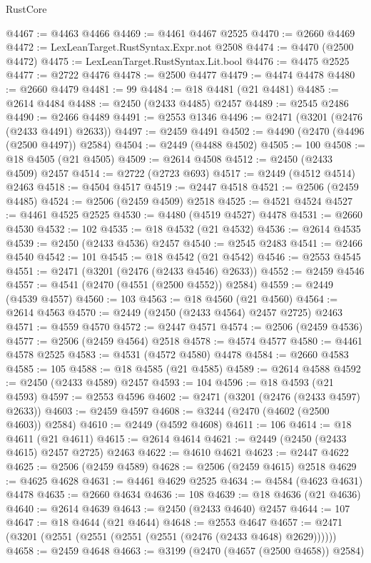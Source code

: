 \begin{lexlean}{RustCore}
\begin{coremodule}
@4467 := @4463 @4466
@4469 := @4461 @4467 @2525
@4470 := @2660 @4469
@4472 := LexLeanTarget.RustSyntax.Expr.not @2508
@4474 := @4470 (@2500 @4472)
@4475 := LexLeanTarget.RustSyntax.Lit.bool
@4476 := @4475 @2525
@4477 := @2722 @4476
@4478 := @2500 @4477
@4479 := @4474 @4478
@4480 := @2660 @4479
@4481 := 99
@4484 := @18 @4481 (@21 @4481)
@4485 := @2614 @4484
@4488 := @2450 (@2433 @4485) @2457
@4489 := @2545 @2486
@4490 := @2466 @4489
@4491 := @2553 @1346
@4496 := @2471 (@3201 (@2476 (@2433 @4491) @2633))
@4497 := @2459 @4491
@4502 := @4490 (@2470 (@4496 (@2500 @4497)) @2584)
@4504 := @2449 (@4488 @4502)
@4505 := 100
@4508 := @18 @4505 (@21 @4505)
@4509 := @2614 @4508
@4512 := @2450 (@2433 @4509) @2457
@4514 := @2722 (@2723 @693)
@4517 := @2449 (@4512 @4514) @2463
@4518 := @4504 @4517
@4519 := @2447 @4518
@4521 := @2506 (@2459 @4485)
@4524 := @2506 (@2459 @4509) @2518
@4525 := @4521 @4524
@4527 := @4461 @4525 @2525
@4530 := @4480 (@4519 @4527) @4478
@4531 := @2660 @4530
@4532 := 102
@4535 := @18 @4532 (@21 @4532)
@4536 := @2614 @4535
@4539 := @2450 (@2433 @4536) @2457
@4540 := @2545 @2483
@4541 := @2466 @4540
@4542 := 101
@4545 := @18 @4542 (@21 @4542)
@4546 := @2553 @4545
@4551 := @2471 (@3201 (@2476 (@2433 @4546) @2633))
@4552 := @2459 @4546
@4557 := @4541 (@2470 (@4551 (@2500 @4552)) @2584)
@4559 := @2449 (@4539 @4557)
@4560 := 103
@4563 := @18 @4560 (@21 @4560)
@4564 := @2614 @4563
@4570 := @2449 (@2450 (@2433 @4564) @2457 @2725) @2463
@4571 := @4559 @4570
@4572 := @2447 @4571
@4574 := @2506 (@2459 @4536)
@4577 := @2506 (@2459 @4564) @2518
@4578 := @4574 @4577
@4580 := @4461 @4578 @2525
@4583 := @4531 (@4572 @4580) @4478
@4584 := @2660 @4583
@4585 := 105
@4588 := @18 @4585 (@21 @4585)
@4589 := @2614 @4588
@4592 := @2450 (@2433 @4589) @2457
@4593 := 104
@4596 := @18 @4593 (@21 @4593)
@4597 := @2553 @4596
@4602 := @2471 (@3201 (@2476 (@2433 @4597) @2633))
@4603 := @2459 @4597
@4608 := @3244 (@2470 (@4602 (@2500 @4603)) @2584)
@4610 := @2449 (@4592 @4608)
@4611 := 106
@4614 := @18 @4611 (@21 @4611)
@4615 := @2614 @4614
@4621 := @2449 (@2450 (@2433 @4615) @2457 @2725) @2463
@4622 := @4610 @4621
@4623 := @2447 @4622
@4625 := @2506 (@2459 @4589)
@4628 := @2506 (@2459 @4615) @2518
@4629 := @4625 @4628
@4631 := @4461 @4629 @2525
@4634 := @4584 (@4623 @4631) @4478
@4635 := @2660 @4634
@4636 := 108
@4639 := @18 @4636 (@21 @4636)
@4640 := @2614 @4639
@4643 := @2450 (@2433 @4640) @2457
@4644 := 107
@4647 := @18 @4644 (@21 @4644)
@4648 := @2553 @4647
@4657 := @2471 (@3201 (@2551 (@2551 (@2551 (@2551 (@2476 (@2433 @4648) @2629))))))
@4658 := @2459 @4648
@4663 := @3199 (@2470 (@4657 (@2500 @4658)) @2584)

\end{coremodule}
\end{lexlean}
